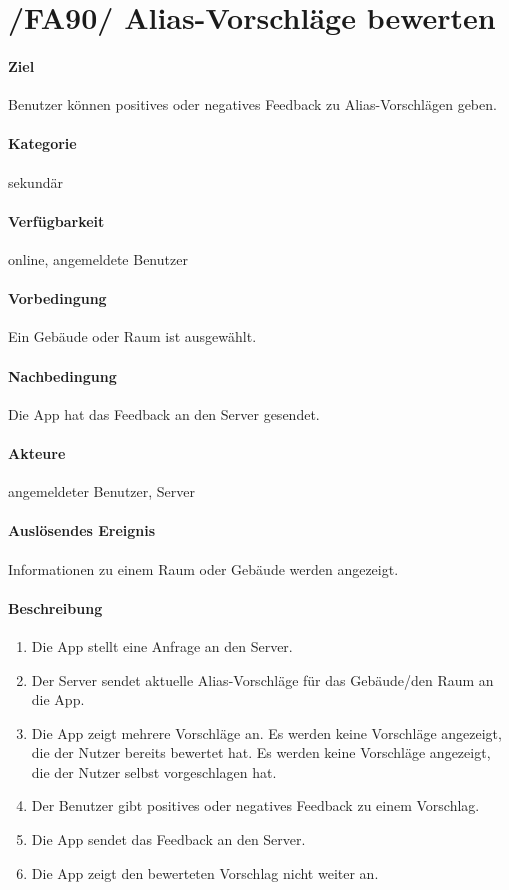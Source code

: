\section{/FA90/ Alias-Vorschläge bewerten}
\label{Aliasbewertungsfunktion}
\label{/FA90/}
\paragraph{Ziel}
Benutzer können positives oder negatives Feedback zu Alias-Vorschlägen geben.
\paragraph{Kategorie}
sekundär
\paragraph{Verfügbarkeit}
online, angemeldete Benutzer
\paragraph{Vorbedingung}
Ein Gebäude oder Raum ist ausgewählt.
\paragraph{Nachbedingung}
Die App hat das Feedback an den Server gesendet.
\paragraph{Akteure}
angemeldeter Benutzer, Server
\paragraph{Auslösendes Ereignis}
Informationen zu einem Raum oder Gebäude werden angezeigt.
\paragraph{Beschreibung}
\begin{enumerate}
    \item Die App stellt eine Anfrage an den Server.
    \item Der Server sendet aktuelle Alias-Vorschläge für das Gebäude/den Raum an die App.
    \item Die App zeigt mehrere Vorschläge an. Es werden keine Vorschläge angezeigt, die der Nutzer bereits bewertet hat. Es werden keine Vorschläge angezeigt, die der Nutzer selbst vorgeschlagen hat.
    \item Der Benutzer gibt positives oder negatives Feedback zu einem Vorschlag.
    \item Die App sendet das Feedback an den Server.
    \item Die App zeigt den bewerteten Vorschlag nicht weiter an.
\end{enumerate}